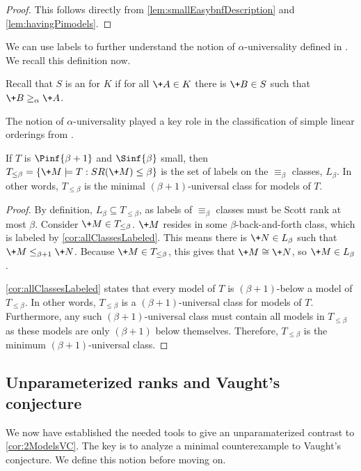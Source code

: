 \documentclass[10pt,a4paper]{amsart}
\renewcommand{\-}{\text{-}}
\begin{document}
\begin{proof}
This follows directly from \cref{lem:smallEasybnfDescription} and \cref{lem:havingPimodels}.
\end{proof}

We can use labels to further understand the notion of $\alpha$-universality defined in \cite{GR24}.
We recall this definition now.
\begin{definition}
Recall that $S$ is an  for $K$ if for all $\+A\in K$ there is $\+B\in S$ such that $\+B\geq_{\alpha}\+A$.
\end{definition}
The notion of $\alpha$-universality played a key role in the classification of simple linear orderings from \cite{GR24}.

\begin{corollary}\label{cor:SRClassificationFromSmall}
  If $T$ is $\Pinf{\beta+1}$ and $\Sinf{\beta}$ small, then $T_{\leq\beta} = \{\+M\models T: SR(\+M)\leq \beta\}$ is the set of labels on the $\equiv_\beta$ classes, $L_\beta$. In other words, $T_{\leq\beta}$ is the minimal $(\beta+1)$-universal class for models of $T$.
\end{corollary}

\begin{proof}
By definition, $L_\beta\subseteq T_{\leq\beta}$, as labels of $\equiv_\beta$ classes must be Scott rank at most $\beta$.
Consider $\+M\in T_{\leq\beta}$.
$\+M$ resides in some $\beta$-back-and-forth class, which is labeled by \cref{cor:allClassesLabeled}.
This means there is $\+N\in L_\beta$ such that $\+M\leq_{\beta+1} \+N$.
Because $\+M\in T_{\leq\beta}$, this gives that $\+M\cong \+N$, so $\+M\in L_\beta$.

\cref{cor:allClassesLabeled} states that every model of $T$ is $(\beta+1)$-below a model of $T_{\leq\beta}$.
In other words, $T_{\leq\beta}$ is a $(\beta+1)$-universal class for models of $T$.
Furthermore, any such $(\beta+1)$-universal class must contain all models in $T_{\leq\beta}$ as these models are only $(\beta+1)$ below themselves.
Therefore, $T_{\leq\beta}$ is the minimum $(\beta+1)$-universal class.
\end{proof}

\subsection{Unparameterized ranks and Vaught's conjecture}
We now have established the needed tools to give an unparamaterized contrast to \cref{cor:2ModelsVC}.
The key is to analyze a minimal counterexample to Vaught's conjecture. 
We define this notion before moving on.
\end{document}

